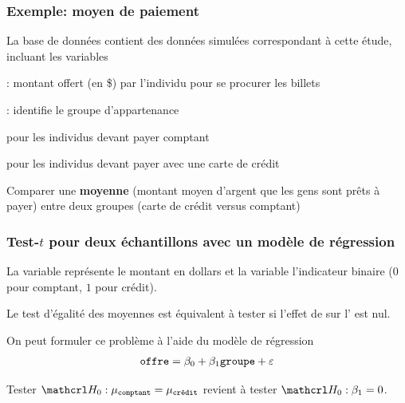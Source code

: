 \documentclass[xcolor={dvipsnames}]{beamer}
\begin{document}
\begin{frame}
\frametitle{Exemple: moyen de paiement}
La base de données  contient des données simulées correspondant à cette étude, incluant les variables
\bi 
\item {}: montant offert (en \$) par l'individu pour se procurer les billets
\item {}: identifie le groupe d'appartenance

\bi
 
\item  {} pour les individus devant payer comptant
\item  {} pour les individus devant payer avec une carte de crédit
\ei
\ei
\begin{tcolorbox}[colback=hecgrey!10!white,colframe=lightgray!75!black,title=Objectif général]
Comparer une \alert{\textbf{moyenne}} (montant moyen d'argent que les gens sont prêts à payer) entre deux groupes (carte de crédit versus comptant)
\end{tcolorbox}

\end{frame}
\begin{frame}
\frametitle{Test-$t$ pour deux échantillons avec un modèle de régression}
\bi

\item La variable  représente le montant en dollars et la variable  l'indicateur binaire ($0$ pour comptant, $1$ pour crédit).
\item Le test d'égalité des moyennes est \alert{équivalent} à tester si l'effet de  sur l' est nul.
\item On peut formuler ce problème à l'aide du modèle de régression
\begin{align*}
\texttt{offre}= \beta_0 + \beta_1 \texttt{groupe} + \varepsilon
\end{align*}
\item  Tester $\Hy_0: \mu_{\code{comptant}}=\mu_{\code{crédit}}$ revient à tester $\Hy_0: \beta_1=0$.
\ei
\end{frame}
\end{document}
